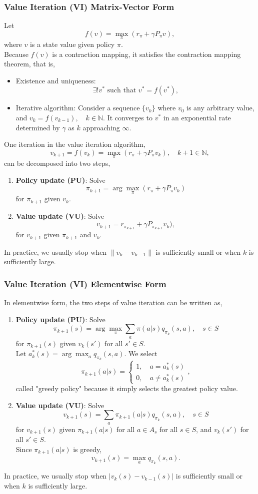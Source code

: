 \documentclass[a4paper,12pt]{report}
\begin{document}
\subsubsection{Value Iteration (VI) Matrix-Vector Form}
Let
\[f(v)=\max_{\pi}\left(r_{\pi}+\gamma P_{\pi}v\right),\]
where $v$ is a state value given policy $\pi$.\\
Because $f(v)$ is a contraction mapping, it satisfies the contraction mapping theorem, that is,
\begin{itemize}
\item Existence and uniqueness:
\[\exists!v^*\text{\ such that\ }v^*=f(v^*),\]
\item Iterative algorithm: Consider a sequence $\{v_k\}$ where $v_0$ is any arbitrary value, and $v_k=f(v_{k-1}),\quad k\in\mathbb{N}$. It converges to $v^*$ in an exponential rate determined by $\gamma$ as $k$ approaching $\infty$.
\end{itemize}
One iteration in the value iteration algorithm,
\[v_{k+1}=f(v_k)=\max_{\pi}\left(r_{\pi}+\gamma P_{\pi}v_k\right),\quad k+1\in\mathbb{N},\]
can be decomposed into two steps,
\begin{enumerate}
\item \textbf{Policy update (PU)}: Solve 
\[\pi_{k+1}=\arg\max_{\pi}(r_{\pi}+\gamma P_{\pi}v_k)\]
for $\pi_{k+1}$ given $v_k$.
\item \textbf{Value update (VU)}: Solve 
\[v_{k+1}=r_{\pi_{k+1}}+\gamma P_{\pi_{k+1}}v_k),\]
for $v_{k+1}$ given $\pi_{k+1}$ and $v_k$.
\end{enumerate}
In practice, we usually stop when $\|v_k-v_{k-1}\|$ is sufficiently small or when $k$ is sufficiently large.
\subsubsection{Value Iteration (VI) Elementwise Form}
In elementwise form, the two steps of value iteration can be written as,
\begin{enumerate}
\item \textbf{Policy update (PU)}: Solve
\[\pi_{k+1}(s)=\arg\max_{\pi}\sum_a\pi(a|s)q_{\pi_k}(s,a),\quad s\in S\]
for $\pi_{k+1}(s)$ given $v_k(s')$ for all $s'\in S$.\\
Let $a^*_k(s)=\arg\max_aq_{\pi_k}(s,a)$. We select
\[\pi_{k+1}(a|s)=\begin{cases}1,\quad a=a^*_k(s)\\0,\quad a\neq a^*_k(s)\end{cases},\]
called "greedy policy" because it simply selects the greatest policy value.
\item \textbf{Value update (VU)}: Solve
\[v_{k+1}(s)=\sum_a\pi_{k+1}(a|s)q_{\pi_k}(s,a),\quad s\in S\]
for $v_{k+1}(s)$ given $\pi_{k+1}(a|s)$ for all $a\in A_s$ for all $s\in S$, and $v_k(s')$ for all $s'\in S$.\\
Since $\pi_{k+1}(a|s)$ is greedy,
\[v_{k+1}(s)=\max_aq_{\pi_k}(s,a).\]
\end{enumerate}
In practice, we usually stop when $|v_k(s)-v_{k-1}(s)|$ is sufficiently small or when $k$ is sufficiently large.
\end{document}
